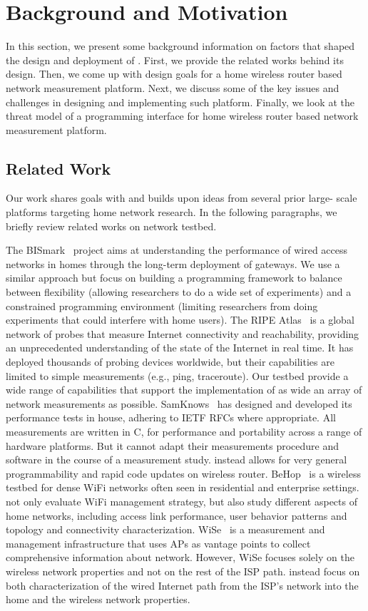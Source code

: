\chapter{Background and Motivation}
\label{sec.background_motivation}
In this section, we present some background information on factors that shaped the design and deployment of \sysname. First, we provide the related works behind its design. Then, we come up with design goals for a home wireless router based network measurement platform. Next, we discuss some of the key issues and  challenges in designing and implementing such platform. Finally, we look at the threat model of a programming interface for home wireless router based network measurement platform.

\section{Related Work}
\label{ssec.related_work}
Our work shares goals with and builds upon ideas from several prior large-
scale platforms targeting home network research. In the following paragraphs, we briefly review related works on network testbed. 

The BISmark~\cite{183951} project aims at understanding the performance of 
wired access networks in homes through the long-term deployment of gateways. 
We use a similar approach but focus on building a programming framework to 
balance between flexibility (allowing researchers to do a wide set of 
experiments) and a constrained programming environment (limiting researchers 
from doing experiments that could interfere with home users). The RIPE Atlas~\cite{ripeatlas} is a global network of probes that measure Internet 
connectivity and reachability, providing an unprecedented understanding of 
the state of the Internet in real time. It has deployed thousands of probing 
devices worldwide, but their capabilities are limited to simple measurements 
(e.g., ping, traceroute). Our testbed provide a wide range of capabilities 
that support the implementation of as wide an array of network measurements 
as possible. SamKnows~\cite{samknows} has designed and developed its 
performance tests in house, adhering to IETF RFCs where appropriate. All 
measurements are written in C, for performance and portability across a 
range of hardware platforms. But it cannot adapt their measurements 
procedure and software in the course of a measurement study. \sysname instead allows for very general programmability and rapid code updates on wireless router. BeHop~\cite{yiakoumis2014behop} is a wireless testbed for dense WiFi networks often seen in residential and enterprise settings. \sysname not only evaluate WiFi management strategy, but also study different aspects of home networks, including access link performance, user behavior patterns and topology and connectivity characterization. WiSe~\cite{patro2013observing} is a measurement and management infrastructure that uses APs as vantage points to collect comprehensive information about network. However, WiSe focuses solely on the wireless network properties and not on the rest of the ISP path. \sysname instead focus on both characterization of the wired Internet path from the ISP’s network into the home and the wireless network properties.

